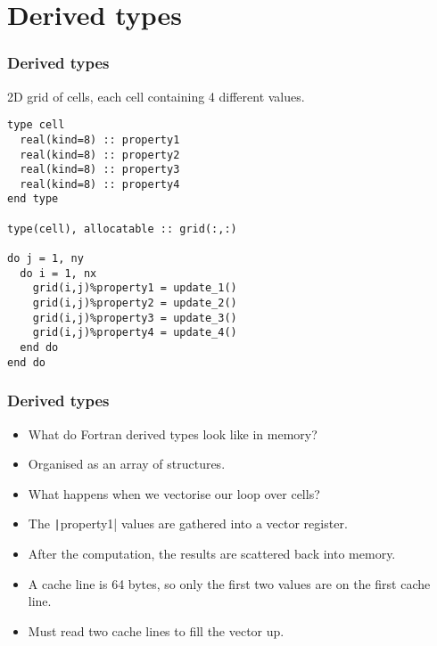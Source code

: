 \documentclass[aspectratio=169]{beamer}
\begin{document}
\section{Derived types}
\begin{frame}[fragile]
\frametitle{Derived types}
2D grid of cells, each cell containing 4 different values.
\begin{verbatim}
type cell
  real(kind=8) :: property1
  real(kind=8) :: property2
  real(kind=8) :: property3
  real(kind=8) :: property4
end type

type(cell), allocatable :: grid(:,:)

do j = 1, ny
  do i = 1, nx
    grid(i,j)%property1 = update_1()
    grid(i,j)%property2 = update_2()
    grid(i,j)%property3 = update_3()
    grid(i,j)%property4 = update_4()
  end do
end do
\end{verbatim}
\end{frame}

\begin{frame}
\frametitle{Derived types}
\begin{itemize}
  \item What do Fortran derived types look like in memory?
  \item Organised as an array of structures.
  \item<2-> What happens when we vectorise our loop over cells?
\end{itemize}

\begin{adjustbox}{max width={\textwidth}}
\end{adjustbox}

\begin{itemize}
  \item<4-> The \texttt|property1| values are gathered into a vector register.
  \item<5-> After the computation, the results are scattered back into memory.
  \item<6-> A cache line is 64 bytes, so only the first two values are on the first cache line.
  \item<6-> Must read two cache lines to fill the vector up.
\end{itemize}
\end{frame}
\end{document}
